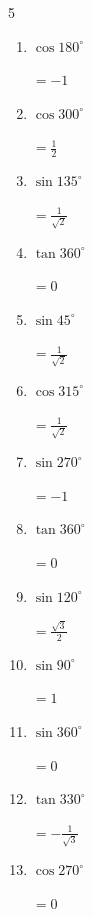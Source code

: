 \begin{multicols}{5}
\begin{enumerate}
  \item $\displaystyle \cos{180^\circ}$

        $\displaystyle =-1$

\columnbreak %

  \item $\displaystyle \cos{300^\circ}$

        $\displaystyle =\frac{1}{2}$

  \item $\displaystyle \sin{135^\circ}$

        $\displaystyle =\frac{1}{\sqrt{2}}$

  \item $\displaystyle \tan{360^\circ}$

        $\displaystyle =0$

  \item $\displaystyle \sin{45^\circ}$

        $\displaystyle =\frac{1}{\sqrt{2}}$

  \item $\displaystyle \cos{315^\circ}$

        $\displaystyle =\frac{1}{\sqrt{2}}$

  \item $\displaystyle \sin{270^\circ}$

        $\displaystyle =-1$

  \item $\displaystyle \tan{360^\circ}$

        $\displaystyle =0$

  \item $\displaystyle \sin{120^\circ}$

        $\displaystyle =\frac{\sqrt{3}}{2}$

  \item $\displaystyle \sin{90^\circ}$

        $\displaystyle =1$

  \item $\displaystyle \sin{360^\circ}$

        $\displaystyle =0$

  \item $\displaystyle \tan{330^\circ}$

        $\displaystyle =-\frac{1}{\sqrt{3}}$

  \item $\displaystyle \cos{270^\circ}$

        $\displaystyle =0$


\end{enumerate}
\end{multicols}
